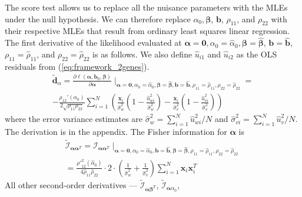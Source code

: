 \documentclass[aap,authoryear, preprint]{imsart}
\numberwithin{equation}{section}
\theoremstyle{plain}
\begin{document}
The score test allows us to replace all the nuisance parameters with the MLEs under the null hypothesis. We can therefore replace $\alpha_0, \bm{\beta}$, $\bm{b}$, $\rho_{11}$, and $\rho_{22}$ with their respective MLEs that result from ordinary least squares linear regression. The first derivative of the likelihood evaluated at $\bm{\alpha}=\bm{0}, \alpha_0 = \hat{\alpha}_0, \bm{\beta} = \bm{\hat{\beta}}$, $\bm{b} = \bm{\hat{b}}$, $\rho_{11} = \hat{\rho}_{11}$, and $\rho_{22} = \hat{\rho}_{22}$ is as follows. We also define $\hat{u}_{i1}$ and $\hat{u}_{i2}$ as the OLS residuals from (\ref{eq:framework_2genes}).
\begin{equation}
\begin{multlined}
\bm{\tilde{d}}_{\alpha} = \frac{\partial \ell(\bm{\alpha}, \bm{b}_0, \bm{\beta})} {\partial \bm{\alpha}}\mid_{\bm{\alpha}=\bm{0}, \alpha_0 = \hat{\alpha}_0, \bm{\beta} = \bm{\hat{\beta}}, \bm{b} = \bm{\hat{b}}, \rho_{11} = \hat{\rho}_{11}, \rho_{22} = \hat{\rho}_{22}} =\\
-\frac{\rho_{12}'(\alpha_0)}{2\sqrt{\rho_{11}\rho_{22}}} \sum_{i=1}^{N} \left(
    \frac{\bm{x}_i}{\hat{\sigma}_{w}^2} 
    \left( 1-\frac{\hat{u}_{wi}^2}{\hat{\sigma}_{w}^2}\right) - 
    \frac{\bm{x}_i}{\hat{\sigma}_{v}^2} 
    \left( 1-\frac{\hat{u}_{vi}^2}{\hat{\sigma}_{v}^2}\right) 
    \right)
\end{multlined}
\label{first_derivative}
\end{equation}
where the error variance estimates are $\hat{\sigma}_w^2 = \sum_{i=1}^{N} \hat{u}_{wi}^2/N$ and $\hat{\sigma}_{vi}^2 = \sum_{i=1}^{N}\hat{u}_v^2/N$. The derivation is in the appendix. The Fisher information for $\bm{\alpha}$ is
\begin{equation}
\begin{multlined}
        \tilde{\mathcal{I}}_{\bm{\alpha}\bm{\alpha}^T} = \mathcal{I}_{\bm{\alpha}\bm{\alpha}^T}\mid_{
        \bm{\alpha}=\bm{0}, 
        \alpha_0 = \hat{\alpha}_0,
        \bm{b} = \bm{\hat{b}},
        \bm{\beta} = \bm{\hat{\beta}},
        {\rho}_{11} = \hat{\rho}_{11},
        {\rho}_{22} = \hat{\rho}_{22}}\\
        = \frac{{\rho'}^2_{12}(\hat{\alpha}_0)}{4\hat{\rho}_{11}\hat{\rho}_{22}}\cdot 2 \cdot \left(\frac{1}{\hat{\sigma}_{w}^2} +  \frac{1}{\hat{\sigma}_{v}^2}\right) \sum_{i=1}^{N} \bm{x}_i \bm{x}_i^T
    \end{multlined}
\end{equation}
All other second-order derivatives --- 
$\tilde{\mathcal{I}}_{\bm{\alpha}\bm{\beta}^T}$,
$\tilde{\mathcal{I}}_{\bm{\alpha}\alpha_0}$,
\end{document}
